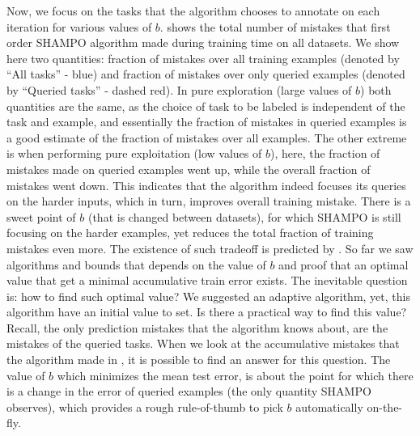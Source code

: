 Now, we focus on the tasks that the algorithm chooses to annotate on each iteration for various values 
of $b$.  shows the total number of mistakes that first order SHAMPO  algorithm 
made during training time on all datasets. 
We show here two quantities: fraction of mistakes over all training examples (denoted by ``All tasks'' - blue) 
and fraction of mistakes over only queried examples (denoted by ``Queried tasks'' - dashed red). 
In pure exploration (large values of $b$) both quantities are the same, as the choice of task to be labeled 
is independent of the task and example, and essentially the fraction of mistakes in queried examples is a 
good estimate of the fraction of mistakes over all examples. 
The other extreme is when performing pure exploitation (low values of
$b$), here, the fraction of mistakes made on queried examples went up, while the overall fraction of mistakes 
went down. This indicates that the algorithm indeed focuses its queries on the harder inputs, which in turn, 
improves overall training mistake. There is a sweet point of $b$ (that is changed between datasets), for 
which SHAMPO is still focusing on the harder examples, yet reduces the total fraction of training mistakes even more. 
The existence of such tradeoff is predicted by .  
So far we saw algorithms and bounds that depends on the value 
of $b$ and proof that an optimal value 
that get a minimal accumulative train error exists. The inevitable question is: how to find such 
optimal value? We suggested an adaptive algorithm, yet, this algorithm have an 
initial value to set. Is there a practical way to find this value? Recall, the only prediction mistakes that the algorithm knows 
about, are the mistakes of the queried tasks. When we look at the accumulative mistakes that the algorithm 
made in  , it is possible to find an answer for this question.
The value of $b$ which minimizes the mean test error, is about the point for which there is a change in the error of 
queried examples (the only quantity SHAMPO observes), which provides a rough rule-of-thumb to pick 
$b$ automatically on-the-fly.


